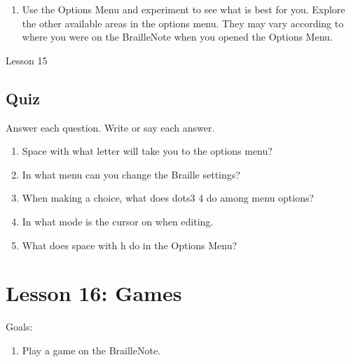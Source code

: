 \documentclass[10pt,letterpaper,twoside]{report}
\begin{document}
{{{{\begin{enumerate}
\begin{enumerate}
		      \item Message display time is next.
		            
		      \item Thumb-key set is next.
		            
		            
	      \end{enumerate}
	\item Use the Options Menu and experiment to see what is best for you.  Explore the other available areas in the options menu.  They may vary according to where you were on the BrailleNote when you opened the Options Menu.
\end{enumerate}





\clearpage

\newpage
Lesson 15

\subsection{Quiz}



Answer each question.  Write or say each answer.



\begin{enumerate}
	\item Space with what letter will take you to the options menu?
	      
	\item In what menu can you change the Braille settings?
	      
	\item When making a choice, what does dots3 4 do among menu options?
	      
	\item In what mode is the cursor on when editing.
	      
	\item What does space with h do in the Options Menu?
\end{enumerate}



\section*{Lesson 16: Games}


Goals:



\begin{enumerate}
	\item Play a game on the BrailleNote.
	      

\end{enumerate}}}}}
\end{document}
